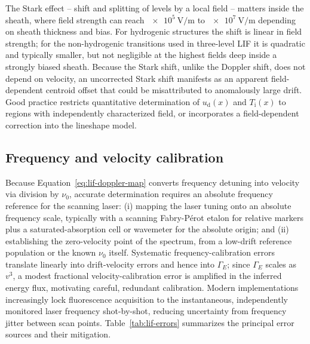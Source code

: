 The Stark effect -- shift and splitting of levels by a local field -- matters inside the sheath, where field strength can reach $\SI{e5}{\volt\per\meter}$ to $\SI{e7}{\volt\per\meter}$ depending on sheath thickness and bias. For hydrogenic structures the shift is linear in field strength; for the non-hydrogenic transitions used in three-level LIF it is quadratic and typically smaller, but not negligible at the highest fields deep inside a strongly biased sheath. Because the Stark shift, unlike the Doppler shift, does not depend on velocity, an uncorrected Stark shift manifests as an apparent field-dependent centroid offset that could be misattributed to anomalously large drift. Good practice restricts quantitative determination of $u_{\mathrm{d}}(x)$ and $T_{\mathrm{i}}(x)$ to regions with independently characterized field, or incorporates a field-dependent correction into the lineshape model.

\subsection{Frequency and velocity calibration}

Because Equation~\eqref{eq:lif-doppler-map} converts frequency detuning into velocity via division by $\nu_{0}$, accurate determination requires an absolute frequency reference for the scanning laser: (i) mapping the laser tuning onto an absolute frequency scale, typically with a scanning Fabry-P\'erot etalon for relative markers plus a saturated-absorption cell or wavemeter for the absolute origin; and (ii) establishing the zero-velocity point of the spectrum, from a low-drift reference population or the known $\nu_{0}$ itself. Systematic frequency-calibration errors translate linearly into drift-velocity errors and hence into $\Gamma_{E}$; since $\Gamma_{E}$ scales as $v^{3}$, a modest fractional velocity-calibration error is amplified in the inferred energy flux, motivating careful, redundant calibration. Modern implementations increasingly lock fluorescence acquisition to the instantaneous, independently monitored laser frequency shot-by-shot, reducing uncertainty from frequency jitter between scan points. Table~\ref{tab:lif-errors} summarizes the principal error sources and their mitigation.


